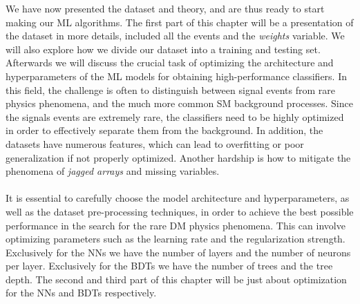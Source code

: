 \documentclass[12pt, a4paper]{book}
\begin{document}
\label{chap:Method_ML}
We have now presented the dataset and theory, and are thus ready to start making our ML algorithms. The first part of this chapter will be a presentation of the dataset in more details, included all the events and the \textit{weights} variable.
We will also explore how we divide our dataset into a training and testing set. Afterwards we will discuss the crucial task of optimizing the architecture and hyperparameters of the ML models for obtaining high-performance classifiers. In this field, the challenge is often to 
distinguish between signal events from rare physics phenomena, and the much more common SM background processes. Since the signals events are extremely rare, the classifiers need to be highly optimized in order to effectively separate them from 
the background. In addition, the datasets have numerous features, which can lead to overfitting or poor generalization if not properly optimized. Another hardship is how to mitigate the phenomena of \textit{jagged arrays} and missing variables.\\
\\It is essential to carefully choose the model architecture and hyperparameters, as well as the dataset pre-processing techniques, in order to achieve the best possible performance in the search for the rare DM physics phenomena. This can involve optimizing 
parameters such as the learning rate and the regularization strength. Exclusively for the NNs we have the number of layers and the number of neurons per layer. Exclusively for the BDTs we have the number of trees and the tree depth. The second and third part of this chapter will be just about optimization for the NNs and BDTs respectively.

\clearpage
\end{document}

